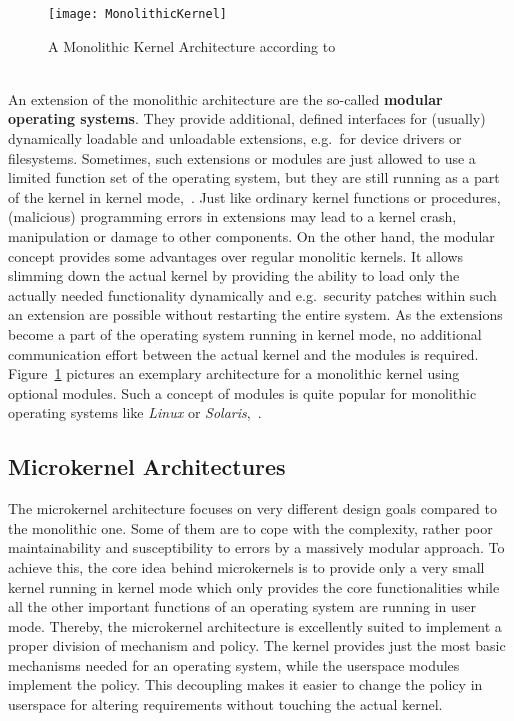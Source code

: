 \begin{figure} [ht]
	\centering
	\texttt{[image: MonolithicKernel]}
	\caption{A Monolithic Kernel Architecture according to~\cite{lfd430}}\label{pic:monolith}
\end{figure} \ \\
%
An extension of the monolithic architecture are the so-called \textbf{modular operating systems}.
They provide additional, defined interfaces for (usually) dynamically loadable and unloadable extensions, e.g.\ for device drivers or filesystems. 
Sometimes, such extensions or modules are just allowed to use a limited function set of the operating system, but they are still running as a part of the kernel in kernel mode\cite{lfd430},~\cite{tanenbaum-modern-operating-systems}. 
Just like ordinary kernel functions or procedures, (malicious) programming errors in extensions may lead to a kernel crash, manipulation or damage to other components.
On the other hand, the modular concept provides some advantages over regular monolitic kernels.
It allows slimming down the actual kernel by providing the ability to load only the actually needed functionality dynamically and e.g.\ security patches within such an extension are possible without restarting the entire system\cite{brause2017betriebssysteme}.
As the extensions become a part of the operating system running in kernel mode, no additional communication effort between the actual kernel and the modules is required.
Figure~\ref{pic:monolith} pictures an exemplary architecture for a monolithic kernel using optional modules.
Such a concept of modules is quite popular for monolithic operating systems like \textit{Linux} or \textit{Solaris}\cite{brause2017betriebssysteme},~\cite{silberschatz2009operating}.

\subsection{Microkernel Architectures}\label{sec:microkernel-archs}
The microkernel architecture focuses on very different design goals compared to the monolithic one. 
Some of them are to cope with the complexity, rather poor maintainability and susceptibility to errors by a massively modular approach. 
To achieve this, the core idea behind microkernels is to provide only a very small kernel running in kernel mode which only provides the core functionalities while all the other important functions of an operating system are running in user mode.
Thereby, the microkernel architecture is excellently suited to implement a proper division of mechanism and policy.
The kernel provides just the most basic mechanisms needed for an operating system, while the userspace modules implement the policy.
This decoupling makes it easier to change the policy in userspace for altering requirements without touching the actual kernel\cite{tanenbaum-modern-operating-systems}.

